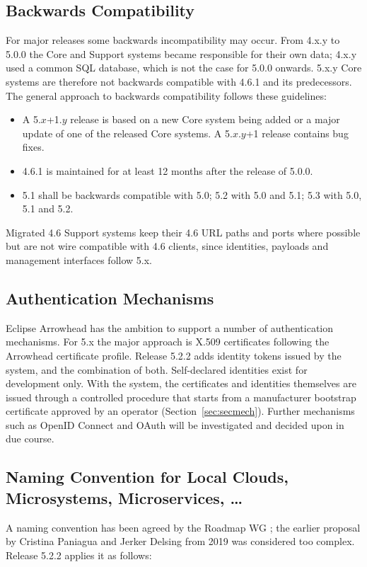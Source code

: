 \documentclass[a4paper]{arrowhead}
\newcommand{\sys}[1]{\textcolor{ArrowheadBlue}{\textbf{\ahbreak{#1}}}}      %
\begin{document}
\subsection{Backwards Compatibility}
\label{sec:nfr:compat}
For major releases some backwards incompatibility may occur. From 4.x.y to 5.0.0 the Core and
Support systems became responsible for their own data; 4.x.y used a common SQL database, which is
not the case for 5.0.0 onwards. 5.x.y Core systems are therefore not backwards compatible with
4.6.1 and its predecessors. The general approach to backwards compatibility follows these
guidelines:
\begin{itemize}
  \item A 5.$x$+1.$y$ release is based on a new Core system being added or a major update of one
        of the released Core systems. A 5.$x$.$y$+1 release contains bug fixes.
  \item 4.6.1 is maintained for at least 12 months after the release of 5.0.0.
  \item 5.1 shall be backwards compatible with 5.0; 5.2 with 5.0 and 5.1; 5.3 with 5.0, 5.1 and
        5.2.
\end{itemize}
Migrated 4.6 Support systems keep their 4.6 URL paths and ports where possible but are not wire
compatible with 4.6 clients, since identities, payloads and management interfaces follow 5.x.

\subsection{Authentication Mechanisms}
Eclipse Arrowhead has the ambition to support a number of authentication mechanisms. For 5.x the
major approach is X.509 certificates following the Arrowhead certificate profile. Release 5.2.2
adds identity tokens issued by the \sys{Authentication} system, and the combination of both.
Self-declared identities exist for development only. With the \sys{Onboarding} system, the
certificates and identities themselves are issued through a controlled procedure that starts from
a manufacturer bootstrap certificate approved by an operator (Section~\ref{sec:secmech}). Further mechanisms such as OpenID Connect
and OAuth will be investigated and decided upon in due course.

\subsection{Naming Convention for Local Clouds, Microsystems, Microservices, \ldots}
\label{sec:nfr:naming}
A naming convention has been agreed by the Roadmap WG \cite{naming2}; the earlier proposal by
Cristina Paniagua and Jerker Delsing from 2019 was considered too complex. Release 5.2.2 applies
it as follows:
\end{document}
